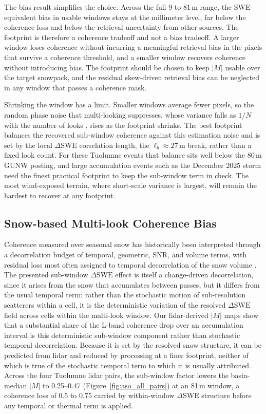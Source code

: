 \documentclass[tc, manuscript]{copernicus}
\begin{document}
The bias result simplifies the choice. Across the full 9 to 81\,\unit{m} range, the SWE-equivalent bias in usable windows stays at the millimeter level, far below the coherence loss and below the retrieval uncertainty from other sources. The footprint is therefore a coherence tradeoff and not a bias tradeoff. A larger window loses coherence without incurring a meaningful retrieval bias in the pixels that survive a coherence threshold, and a smaller window recovers coherence without introducing bias. The footprint should be chosen to keep $|M|$ usable over the target snowpack, and the residual skew-driven retrieval bias can be neglected in any window that passes a coherence mask.

Shrinking the window has a limit. Smaller windows average fewer pixels, so the random phase noise that multi-looking suppresses, whose variance falls as $1/N$ with the number of looks \citep{Bamler1998}, rises as the footprint shrinks. The best footprint balances the recovered sub-window coherence against this estimation noise and is set by the local $\Delta\mathrm{SWE}$ correlation length, the $\ell_b \approx 27$\,\unit{m} break, rather than a fixed look count. For these Tuolumne events that balance sits well below the 80\,\unit{m} GUNW posting, and large accumulation events such as the December 2025 storm need the finest practical footprint to keep the sub-window term in check. The most wind-exposed terrain, where short-scale variance is largest, will remain the hardest to recover at any footprint.

\subsection{Snow-based Multi-look Coherence Bias}\label{subsec:coherence-bias}

Coherence measured over seasonal snow has historically been interpreted through a decorrelation budget of temporal, geometric, SNR, and volume terms, with residual loss most often assigned to temporal decorrelation of the snow volume \citep{Ruiz2021, Oveisgharan2024}. The presented sub-window $\Delta\mathrm{SWE}$ effect is itself a change-driven decorrelation, since it arises from the snow that accumulates between passes, but it differs from the usual temporal term: rather than the stochastic motion of sub-resolution scatterers within a cell, it is the deterministic variation of the resolved $\Delta\mathrm{SWE}$ field across cells within the multi-look window. Our lidar-derived $|M|$ maps show that a substantial share of the L-band coherence drop over an accumulation interval is this deterministic sub-window component rather than stochastic temporal decorrelation. Because it is set by the resolved snow structure, it can be predicted from lidar and reduced by processing at a finer footprint, neither of which is true of the stochastic temporal term to which it is usually attributed.  Across the four Tuolumne lidar pairs, the sub-window factor lowers the basin-median $|M|$ to 0.25--0.47 (Figure~\ref{fig:aso_all_pairs}) at an 81\,\unit{m} window, a coherence loss of 0.5 to 0.75 carried by within-window $\Delta\mathrm{SWE}$ structure before any temporal or thermal term is applied.
\end{document}
